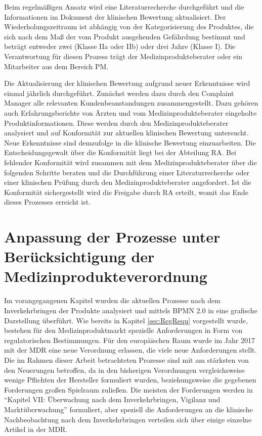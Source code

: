 \documentclass[a4paper,12pt]{report}
\begin{document}
Beim regelmäßigen Ansatz wird eine Literaturrecherche durchgeführt und die Informationen im Dokument der klinischen Bewertung aktualisiert. Der Wiederholungszeitraum ist abhängig von der Kategorisierung des Produktes, die sich nach dem Maß der vom Produkt ausgehenden Gefährdung bestimmt und beträgt entweder zwei (Klasse IIa oder IIb) oder drei Jahre (Klasse I). Die Verantwortung für diesen Prozess trägt der Medizinprodukteberater oder ein Mitarbeiter aus dem Bereich PM.

Die Aktualisierung der klinischen Bewertung aufgrund neuer Erkenntnisse wird einmal jährlich durchgeführt. Zunächst werden dazu durch den Complaint Manager alle relevanten Kundenbeanstandungen zusammengestellt. Dazu gehören auch Erfahrungsberichte von Ärzten und vom Medizinprodukteberater eingeholte Produktinformationen. Diese werden durch den Medizinprodukteberater analysiert und auf Konformität zur aktuellen klinischen Bewertung untersucht. Neue Erkenntnisse sind demzufolge in die klinische Bewertung einzuarbeiten. Die Entscheidungsgewalt über die Konformität liegt bei der Abteilung RA. Bei fehlender Konformität wird zusammen mit dem Medizinprodukteberater über die folgenden Schritte beraten und die Durchführung einer Literaturrecherche oder einer klinischen Prüfung durch den Medizinprodukteberater angefordert. Ist die Konformität sichergestellt wird die Freigabe durch RA erteilt, womit das Ende dieses Prozesses erreicht ist.
\chapter{Anpassung der Prozesse unter Berücksichtigung der Medizinprodukteverordnung}\label{chap:AnpassungAnMDR}
Im vorangegangenen Kapitel wurden die aktuellen Prozesse nach dem Inverkehrbringen der Produkte analysiert und mittels BPMN 2.0 in eine grafische Darstellung überführt. Wie bereits in Kapitel \ref{sec:RegRequ} vorgestellt wurde, bestehen für den Medizinproduktmarkt spezielle Anforderungen in Form von regulatorischen Bestimmungen. Für den europäischen Raum wurde im Jahr 2017 mit der MDR eine neue Verordnung erlassen, die viele neue Anforderungen stellt. Die im Rahmen dieser Arbeit betrachteten Prozesse sind mit am stärksten von den Neuerungen betroffen, da in den bisherigen Verordnungen vergleichsweise wenige Pflichten der Hersteller formuliert wurden, beziehungsweise die gegebenen Forderungen großen Spielraum zuließen. Die meisten der Forderungen werden in "`Kapitel VII: Überwachung nach dem Inverkehrbringen, Vigilanz und Marktüberwachung"' formuliert, aber speziell die Anforderungen an die klinische Nachbeobachtung nach dem Inverkehrbringen verteilen sich über einige einzelne Artikel in der MDR.
\end{document}

